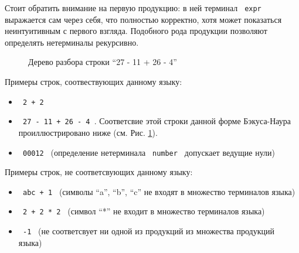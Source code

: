 Стоит обратить внимание на первую продукцию: в ней терминал \texttt{ expr } выражается сам через себя, что полностью корректно, хотя может показаться неинтуитивным с первого взгляда. Подобного рода продукции позволяют определять нетерминалы рекурсивно.

\begin{figure}[ht]
\begin{center}
\caption{
\label{lit:bnf_ex_pic} Дерево разбора строки \enquote{27 - 11 + 26 - 4}
}
\end{center}
\end{figure}


Примеры строк, соотвествующих данному языку:
\begin{itemize}
    \item \texttt{ 2 + 2 }
    \item \texttt{ 27 - 11 + 26 - 4 }. Соответсвие этой строки данной форме Бэкуса-Наура проиллюстрировано ниже (см. Рис. \ref{lit:bnf_ex_pic}).
    \item \texttt{ 00012 } (определение нетерминала \texttt{ number } допускает ведущие нули)
\end{itemize}

Примеры строк, не соответсвующих данному языку:
\begin{itemize}
    \item \texttt{ abc + 1 } (символы \enquote{a}, \enquote{b}, \enquote{c} не входят в множество терминалов языка)
    \item \texttt{ 2 + 2 * 2 } (символ \enquote{*} не входит в множество терминалов языка)
    \item \texttt{ -1 } (не соответсвует ни одной из продукций из множества продукций языка)
\end{itemize}

